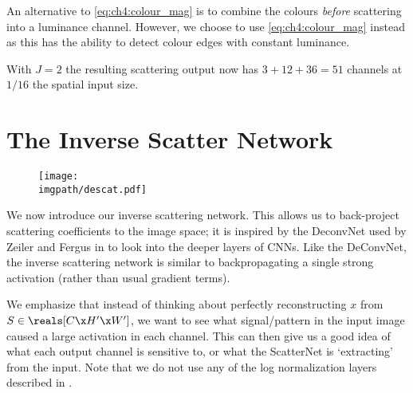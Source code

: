 An alternative to \eqref{eq:ch4:colour_mag} is to combine the colours
\emph{before} scattering into a luminance channel. However, we choose to use \eqref{eq:ch4:colour_mag}
instead as this has the ability to detect colour edges with constant luminance.

With $J=2$ the resulting scattering output now has $3 + 12 + 36 = 51$ channels at $1/16$ the
spatial input size.

\section{The Inverse Scatter Network}\label{sec:ch4:descatternet}
\begin{figure}[t]
  \centering
  \texttt{[image: \\imgpath/descat.pdf]}
  \label{fig:ch4:descat}
\end{figure}

We now introduce our inverse scattering network. This allows us to back-project
scattering coefficients to the image space; it is inspired by the
DeconvNet used by Zeiler and Fergus in
\cite{zeiler_visualizing_2014} to look into the deeper layers of CNNs. Like
the DeConvNet, the inverse scattering network is similar to backpropagating a
single strong activation (rather than usual gradient terms).

We emphasize that instead of thinking about perfectly reconstructing $x$ from
$S\in \reals[C\x H'\x W']$, we want to see what signal/pattern in the input image caused
a large activation in each channel. This can then give us a good idea of what each
output channel is sensitive to, or what the ScatterNet is `extracting' from the input.
Note that we do not use any of the log normalization layers described in
\cite{oyallon_deep_2015, singh_dual-tree_2017}.

